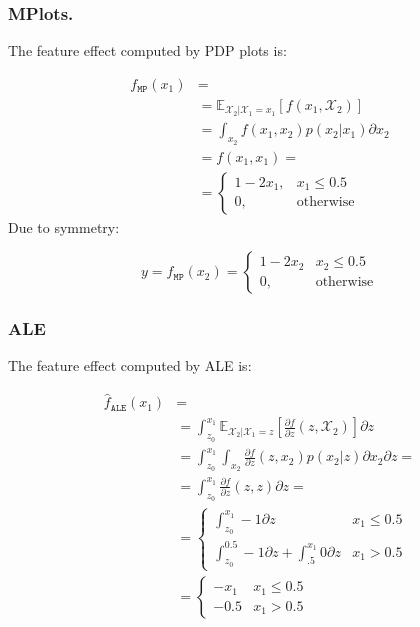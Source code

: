 \documentclass[wcp]{jmlr}
\newcommand{\E}{\mathbb{E}}
\begin{document}
\subsubsection*{MPlots.}

The feature effect computed by PDP plots is:

\begin{equation}
  \label{eq:example-1-MPlots}
  \begin{split}
    f_{\mathtt{MP}}(x_1) &= \\
    & = \mathbb{\E}_{\mathcal{X}_2|\mathcal{X}_1=x_1}[f(x_1,\mathcal{X}_2)] \\
    & = \int_{x_2} f(x_1,x_2) p(x_2|x_1) \partial x_2 \\
    & =   f(x_1, x_1) = \\
  & = \begin{cases}
    1 - 2x_1, & x_1 \leq 0.5 \\
    0, & \text{otherwise}
\end{cases}
  \end{split}
\end{equation}
%
Due to symmetry:

\begin{equation}
  y = f_{\mathtt{MP}}(x_2) =
  \begin{cases}
    1 - 2x_2 & x_2 \leq 0.5 \\
    0, &\text{otherwise}
  \end{cases}
\end{equation}

\subsubsection*{ALE}

The feature effect computed by ALE is:

\begin{equation}
  \label{eq:example-1-ale}
  \begin{split}
    \hat{f}_{\mathtt{ALE}}(x_1) &= \\
    & = \int_{z_0}^{x_1} \mathbb{E}_{\mathcal{X}_2|\mathcal{X}_1=z} \left [\frac{\partial f}{\partial z}(z, \mathcal{X}_2) \right ] \partial z \\
    & = \int_{z_0}^{x_1} \int_{x_2} \frac{\partial f}{\partial z}(z,x_2) p(x_2|z)  \partial x_2 \partial z = \\
    & = \int_{z_0}^{x_1} \frac{\partial f}{\partial z}(z,z) \partial z = \\
    & = \begin{cases}
      \int_{z_0}^{x_1} -1 \partial z & x_1 \leq 0.5 \\
      \int_{z_0}^{0.5} -1 \partial z + \int_{.5}^{x_1} 0 \partial z & x_1 > 0.5
    \end{cases} \\
    & = \begin{cases}
      -x_1 & x_1 \leq 0.5 \\
      -0.5 & x_1 > 0.5
    \end{cases}
  \end{split}
\end{equation}
\end{document}
